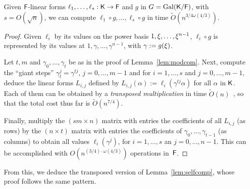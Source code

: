 \begin{lemma}
  \label{lem:modcomT}
  Given ${\mathsf{F}}$-linear forms $\ell_1,\dots,\ell_s:{\mathsf{K}}\to {\mathsf{F}}$ and $g$ in $G =
  \mathrm{Gal}({\mathsf{K}}/{\mathsf{F}})$, with $s = O(\sqrt{n})$, we can compute
  $\ell_1\circ g,\dots,\ell_s \circ g$ in time $\tilde
  O(n^{{3}/{4}\omega({4}/{3})})$.
\end{lemma}
\begin{proof}
  Given $\ell_i$ by its values on the power basis $1,\xi,\dots,\xi^{n-1}$, $\ell_i \circ g$ is represented by its values at
  $1,\gamma,\dots,\gamma^{n-1}$, with $\gamma := g(\xi)$. 

  Let $t,m$ and $\gamma_0,\dots,\gamma_t$ be as in the proof of
  Lemma~\ref{lem:modcom}. Next, compute the ``giant steps''
  $\gamma_t^j = \gamma^{tj}$, $j=0,\dots,m-1$ and for $i=1,\dots,s$
  and $j=0,\dots,m-1$, deduce the linear forms $L_{i,j}$ defined by
  $L_{i,j}(\alpha) := \ell_i(\gamma^{tj}\alpha)$ for all $\alpha$ in
  ${\mathsf{K}}$. Each of them can be obtained by a {\em transposed
    multiplication} in time $\tilde{O}(n)$~\citep[Section~4.1]{Shoup},
  so that the total cost thus far is $\tilde{O}(n^{7/4})$.

  Finally, multiply the $(sm \times n)$ matrix with entries the
  coefficients of all $L_{i,j}$ (as rows) by the $(n \times t)$ matrix with
  entries the coefficients of $\gamma_0,\dots,\gamma_{t-1}$ (as columns) to
  obtain all values $\ell_i(\gamma^j)$, for $i=1,\dots,s$ an
  $j=0,\dots,n-1$.  This can be accomplished with
  $O(n^{(3/4)\cdot\omega(4/3)})$ operations in~${\mathsf{F}}$.
\end{proof}

From this, we deduce the transposed version of Lemma~\ref{lem:selfcomp},
whose proof follows the same pattern.


